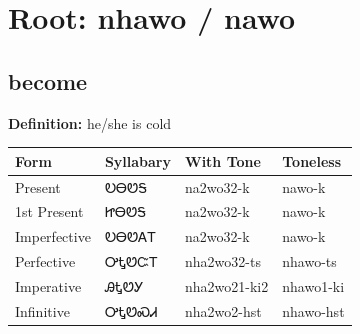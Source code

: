 \documentclass{article}%
\begin{document}
%
\normalsize%
\section*{Root: nhawo / nawo}%
\subsection*{become}%
\textbf{Definition: }%
he/she is cold%
\\[0.5em]%
\begin{tabular}{|l|l|l|l|}%
\hline%
\textbf{Form}&\textbf{Syllabary}&\textbf{With Tone}&\textbf{Toneless}\\%
\hline%
Present&ᎧᎾᏬᎦ&na2wo32{-}k&nawo{-}k\\%
1st Present&ᏥᎾᏬᎦ&na2wo32{-}k&nawo{-}k\\%
Imperfective&ᎧᎾᏬᎪᎢ&na2wo32{-}k&nawo{-}k\\%
Perfective&ᎤᎿᏬᏨᎢ&nha2wo32{-}ts&nhawo{-}ts\\%
Imperative&ᎯᎿᏬᎩ&nha2wo21{-}ki2&nhawo1{-}ki\\%
Infinitive&ᎤᎿᏬᏍᏗ&nha2wo2{-}hst&nhawo{-}hst\\%
\hline%
\end{tabular}%
\\[1em]%
\end{document}
